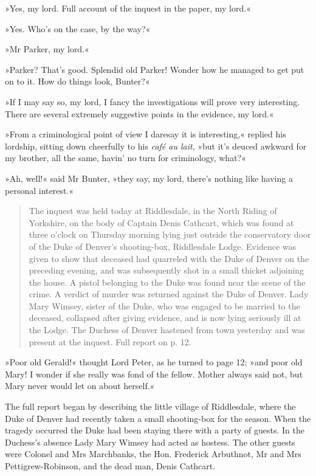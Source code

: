 »Yes, my lord. Full account of the inquest in the paper, my lord.«

»Yes. Who's on the case, by the way?«

»Mr Parker, my lord.«

»Parker? That's good. Splendid old Parker! Wonder how he managed to get put on to it. How do things look, Bunter?«

»If I may say so, my lord, I fancy the investigations will prove very interesting. There are several extremely suggestive points in the evidence, my lord.«

»From a criminological point of view I daresay it is interesting,« replied his lordship, sitting down cheerfully to his \foreignlanguage{french}{\textit{café au lait}}, »but it's deuced awkward for my brother, all the same, havin' no turn for criminology, what?«

»Ah, well!« said Mr Bunter, »they say, my lord, there's nothing like having a personal interest.«

\begin{quote}
\indent The inquest was held today at Riddlesdale, in the North Riding of Yorkshire, on the body of Captain Denis Cathcart, which was found at three o'clock on Thursday morning lying just outside the conservatory door of the Duke of Denver's shooting-box, Riddlesdale Lodge. Evidence was given to show that deceased had quarreled with the Duke of Denver on the preceding evening, and was subsequently shot in a small thicket adjoining the house. A pistol belonging to the Duke was found near the scene of the crime. A verdict of murder was returned against the Duke of Denver. Lady Mary Wimsey, sister of the Duke, who was engaged to be married to the deceased, collapsed after giving evidence, and is now lying seriously ill at the Lodge. The Duchess of Denver hastened from town yesterday and was present at the inquest. Full report on p. 12.  
\end{quote}

»Poor old Gerald!« thought Lord Peter, as he turned to page 12; »and poor old Mary! I wonder if she really was fond of the fellow. Mother always said not, but Mary never would let on about herself.«

The full report began by describing the little village of Riddlesdale, where the Duke of Denver had recently taken a small shooting-box for the season. When the tragedy occurred the Duke had been staying there with a party of guests. In the Duchess's absence Lady Mary Wimsey had acted as hostess. The other guests were Colonel and Mrs Marchbanks, the Hon. Frederick Arbuthnot, Mr and Mrs Pettigrew-Robinson, and the dead man, Denis Cathcart.

